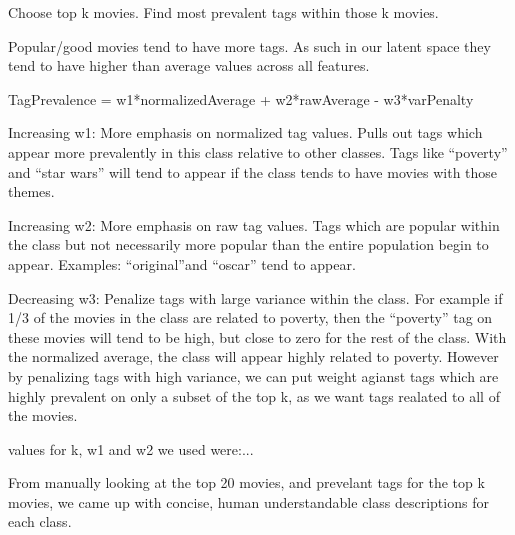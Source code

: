 Choose top k movies.  Find most prevalent tags within those k movies.

Popular/good movies tend to have more tags.  As such in our latent space they tend to have higher than average values across all features.

TagPrevalence = w1*normalizedAverage + w2*rawAverage - w3*varPenalty

Increasing w1: More emphasis on normalized tag values.  Pulls out tags which appear more prevalently in this class relative to other classes.  Tags like ``poverty'' and ``star wars'' will tend to appear if the class tends to have movies with those themes.

Increasing w2: More emphasis on raw tag values.  Tags which are popular within the class but not necessarily more popular than the entire population begin to appear.  Examples: ``original''and ``oscar'' tend to appear.

Decreasing w3: Penalize tags with large variance within the class.  For example if 1/3 of the movies in the class are related to poverty, then the ``poverty'' tag on these movies will tend to be high, but close to zero for the rest of the class.  With the normalized average, the class will appear highly related to poverty.  However by penalizing  tags with high variance, we can put weight agianst tags which are highly prevalent on only a subset of the top k, as we want tags realated to all of the movies.

values for k, w1 and w2 we used were:...

From manually looking at the top 20 movies, and prevelant tags for the top k movies, we came up with concise, human understandable class descriptions for each class.